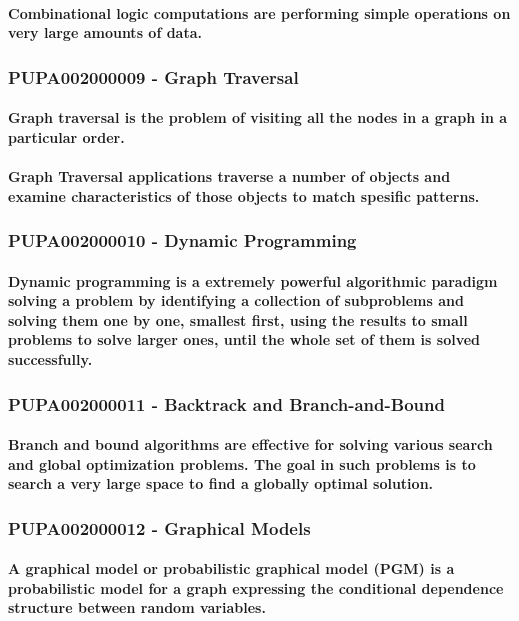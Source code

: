 \documentclass{acm_proc_article-sp}
\begin{document}
\paragraph{Combinational logic computations are performing simple operations on very large amounts of data.}
\subsubsection{PUPA002000009 - Graph Traversal}
\paragraph{Graph traversal is the problem of visiting all the nodes in a graph in a particular order.}
\paragraph{Graph Traversal applications traverse a number of objects and examine characteristics of those objects to match spesific patterns.}
\subsubsection{PUPA002000010 - Dynamic Programming}
\paragraph{Dynamic programming is a extremely powerful algorithmic paradigm solving a problem by identifying a collection of subproblems and solving them one by one, smallest first, using the results to small problems to solve larger ones, until the whole set of them is solved successfully.}
\subsubsection{PUPA002000011 - Backtrack and Branch-and-Bound}
\paragraph{Branch and bound algorithms are effective for solving various search and global optimization problems. The goal in such problems is to search a very large space to find a globally optimal solution.}
\subsubsection{PUPA002000012 - Graphical Models}
\paragraph{A graphical model or probabilistic graphical model (PGM) is a probabilistic model for a graph expressing the conditional dependence structure between random variables.}
\end{document}

